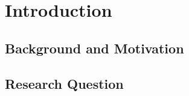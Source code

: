 \chapter{Introduction}
\label{cha:intro}

\section{Background and Motivation}

\section{Research Question}